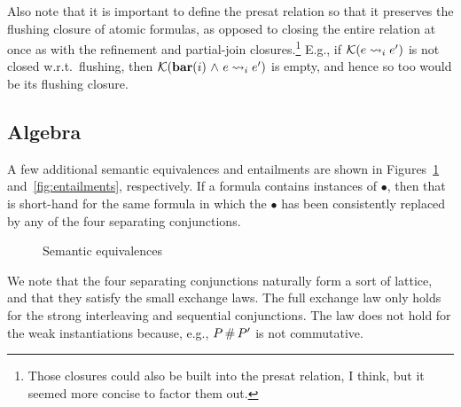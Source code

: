 \documentclass[11pt]{article}
\begin{document}
Also note that it is important to define the presat relation so that it preserves the flushing closure of atomic formulas, as opposed to closing the entire relation at once as with the refinement and partial-join closures.\footnote{Those closures could also be built into the presat relation, I think, but it seemed more concise to factor them out.} E.g., if $\mathcal{K}(e \leadsto_{i} e')$ is not closed w.r.t.~flushing, then $\mathcal{K}(\mathbf{bar}(i) \operatorname{\,\wedge\,} e \leadsto_{i} e')$ is empty, and hence so too would be its flushing closure.  

\subsection{Algebra}
\label{sec:algebra}

A few additional semantic equivalences and entailments are shown in Figures~\ref{fig:equivalences} and~\ref{fig:entailments}, respectively. If a formula contains instances of $\bullet$, then that is short-hand for the same formula in which the $\bullet$ has been consistently replaced by any of the four separating conjunctions. 

\begin{figure}[ht]
	\centering
	\caption{\label{fig:equivalences}Semantic equivalences}
\end{figure}

We note that the four separating conjunctions naturally form a sort of lattice, and that they satisfy the small exchange laws. The full exchange law only holds for the strong interleaving and sequential conjunctions. The law does not hold for the weak instantiations because, e.g., $P \operatorname{\#} P'$ is not commutative. 
\end{document}
